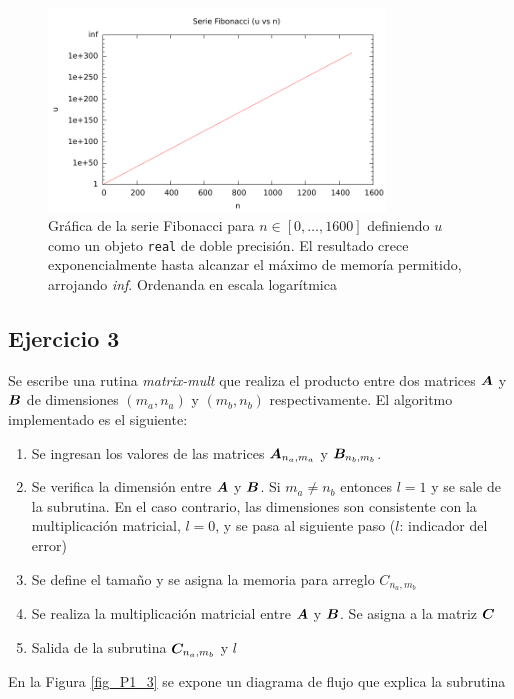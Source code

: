 \begin{figure} [H]
\begin{center}
\includegraphics[width=0.8\textwidth]{./parte2/graficos/grafico_p2_real.pdf}
\caption{Gráfica de la serie Fibonacci para $n \in [0, \ldots , 1600]$ definiendo $u$ como un objeto \texttt{real} de doble precisión. El resultado crece exponencialmente hasta alcanzar el máximo de memoría permitido, arrojando \textit{inf}. Ordenanda en escala logarítmica} \label{fig_P1_2_real}
\end{center}
\end{figure}


\subsection{Ejercicio 3}

Se escribe una rutina \textit{matrix-mult} que realiza el producto entre dos matrices $\boldsymbol{A}$ y $\boldsymbol{B}$ de dimensiones $(m_a,n_a)$ y $(m_b,n_b)$ respectivamente. El algoritmo implementado es el siguiente:
\begin{enumerate}
\item Se ingresan los valores de las matrices $\boldsymbol{A}_{n_a,m_a}$ y $\boldsymbol{B}_{n_b,m_b}$.
\item Se verifica la dimensión entre $\boldsymbol{A}$ y $\boldsymbol{B}$. Si $m_a \neq n_b$ entonces $l=1$ y se sale de la subrutina. En el caso contrario, las dimensiones son consistente con la multiplicación matricial, $l=0$, y se pasa al siguiente paso ($l$: indicador del error)
\item Se define el tamaño y se asigna la memoria para arreglo $C_{n_a,m_b}$
\item Se realiza la multiplicación matricial entre $\boldsymbol{A}$ y $\boldsymbol{B}$. Se asigna a la matriz $\boldsymbol{C}$
\item Salida de la subrutina $\boldsymbol{C_}{n_a,m_b}$ y $l$
\end{enumerate}
En la Figura \ref{fig_P1_3} se expone un diagrama de flujo que explica la subrutina

